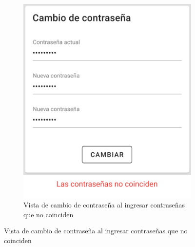 \begin{figure}[H]
\begin{subfigure}[b]{0.45\textwidth}
        \includegraphics[width=\textwidth]{images/app/change-psw-error2.png}
        \caption{Vista de cambio de contraseña al ingresar contraseñas que no coinciden}
        \label{fig:app-change-psw_error-2}
    \end{subfigure}
    \label{fig:app-change-psw-2}
\end{figure}

